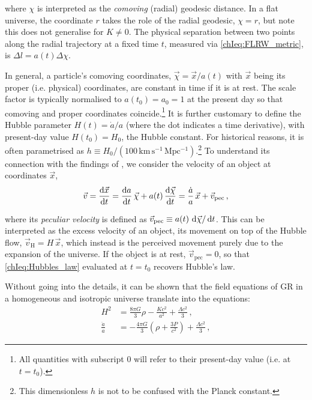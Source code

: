 \noindent where $\chi$ is interpreted as the \textit{comoving} (radial) geodesic distance. In a flat universe, the coordinate $r$ takes the role of the radial geodesic, $\chi = r$, but note this does not generalise for $K \neq 0$. The physical separation between two points along the radial trajectory at a fixed time $t$, measured via \cref{chIeq:FLRW_metric}, is $\Delta l = a(t) \Delta \chi$.

In general, a particle's comoving coordinates, $\vec{\chi} = \vec{x} / a(t)$ with $\vec{x}$ being its proper (i.e. physical) coordinates, are constant in time if it is at rest. The scale factor is typically normalised to $a(t_0) = a_0 = 1$ at the present day so that comoving and proper coordinates coincide.\footnote{All quantities with subscript $0$ will refer to their present-day value (i.e. at $t = t_0$).} It is further customary to define the Hubble parameter $H(t) = \dot{a}/a$ (where the dot indicates a time derivative), with present-day value $H(t_0) = H_0$, the Hubble constant. For historical reasons, it is often parametrised as $h \equiv H_0/(100 \, \mathrm{km \, s^{-1} \, Mpc^{-1}})$.\footnote{This dimensionless $h$ is not to be confused with the Planck constant.} To understand its connection with the findings of \citet{1929PNAS...15..168H}, we consider the velocity of an object at coordinates $\vec{x}$,
\begin{equation}
    \label{chIeq:Hubbles_law}
    \vec{v} = \frac{\dif \vec{x}}{\dif t} = \frac{\dif a}{\dif t} \, \vec{\chi} + a(t) \, \frac{\dif \vec{\chi}}{\dif t} = \frac{\dot{a}}{a} \, \vec{x} + \vec{v}_\text{pec} \, ,
\end{equation}

\noindent where its \textit{peculiar velocity} is defined as $\vec{v}_\text{pec} \equiv a(t) \, \dif \vec{\chi} / \dif t$. This can be interpreted as the excess velocity of an object, its movement on top of the Hubble flow, $\vec{v}_\text{H} = H \, \vec{x}$, which instead is the perceived movement purely due to the expansion of the universe. If the object is at rest, $\vec{v}_\text{pec} = 0$, so that \cref{chIeq:Hubbles_law} evaluated at $t = t_0$ recovers Hubble's law.

Without going into the details, it can be shown \citep[see e.g.][]{2010gfe..book.....M} that the field equations of GR in a homogeneous and isotropic universe translate into the \citeauthor{1922ZPhy...10..377F} equations:
\begin{align}
    \label{chIeq:Friedmann_equation1}
    H^2 & = \frac{8 \pi G}{3} \rho - \frac{K c^2}{a^2} + \frac{\Lambda c^2}{3} \, ,
    \\
    \label{chIeq:Friedmann_equation2}
    \frac{\ddot{a}}{a} & =  -\frac{4 \pi G}{3} \left( \rho + \frac{3 P}{c^2} \right) + \frac{\Lambda c^2}{3} \, ,
\end{align}

